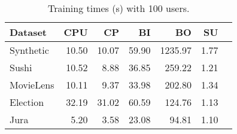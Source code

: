 \begin{table}
\centering
\caption{Training times (s) with 100 users.}
\begin{tabular}{@{\ic}l@{\ic}r@{\ic}r@{\ic}r@{\ic}r@{\ic}r@{\ic}r@{\ic}}
\hline
\textbf{Dataset} &\textbf{CPU}&\textbf{CP}&\textbf{BI}&\textbf{BO}&\textbf{SU}\\
\hline
Synthetic&10.50&10.07&59.90&1235.97&1.77\\
Sushi&10.52&8.88&36.85&259.22&1.21\\
MovieLens&10.11&9.37&33.98&202.80&1.34\\
Election&32.19&31.02&60.59&124.76&1.13\\
Jura&5.20&3.58&23.08&94.81&1.10\\
\hline
\end{tabular} \label{tab:timeSmallDatasets}
\label{tab:small}
\end{table}

